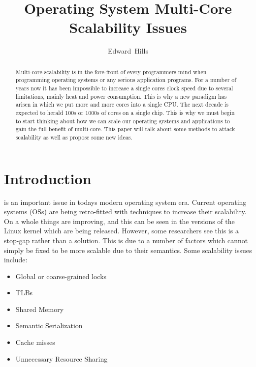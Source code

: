 \documentclass[journal]{IEEEtran}
\begin{document}
\title{Operating System Multi-Core Scalability Issues}

\author{Edward~Hills}

\maketitle

\begin{abstract}

Multi-core scalability is in the fore-front of every programmers mind when programming operating systems or any serious application programs. For a number of years now it has been impossible to increase a single cores clock speed due to several limitations, mainly heat and power consumption. This is why a new paradigm has arisen in which we put more and more cores into a single CPU. The next decade is expected to herald 100s or 1000s of cores on a single chip. This is why we must begin to start thinking about how we can scale our operating systems and applications to gain the full benefit of multi-core. This paper will talk about some methods to attack scalability as well as propose some new ideas.

\end{abstract}

\section{Introduction}
 is an important issue in todays modern operating system era. Current operating systems (OSs) are being retro-fitted with techniques to increase their scalability. On a whole things are improving, and this can be seen in the versions of the Linux kernel which are being released. However, some researchers see this is a stop-gap rather than a solution. This is due to a number of factors which cannot simply be fixed to be more scalable due to their semantics. Some scalability issues include:

\vspace{2mm}

\begin{itemize}
\item Global or coarse-grained locks
\item TLBs
\item Shared Memory
\item Semantic Serialization
\item Cache misses
\item Unnecessary Resource Sharing
\end{itemize}
\end{document}

